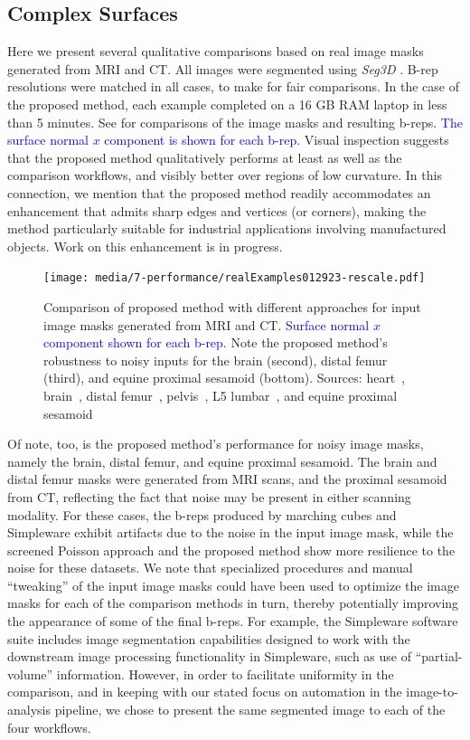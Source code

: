 \subsection{Complex Surfaces}
\label{Complex Surfaces}

Here we present several qualitative comparisons based on real image masks generated from MRI and CT.  All images were segmented using \textit{Seg3D} \cite{Seg3D}.  B-rep resolutions were matched in all cases, to make for fair comparisons.  In the case of the proposed method, each example completed on a 16 GB RAM laptop in less than 5 minutes. See  for comparisons of the image masks and resulting b-reps.  \textcolor{blue}{The surface normal $x$ component is shown for each b-rep.}  Visual inspection suggests that the proposed method qualitatively performs at least as well as the comparison workflows, and visibly better over regions of low curvature.   In this connection, we mention that the proposed method readily accommodates an enhancement that admits sharp edges and vertices (or corners), making the method particularly suitable for industrial applications involving manufactured objects.  Work on this enhancement is in progress.  
\begin{figure}[h!]
	\centering
	 \texttt{[image: media/7-performance/realExamples012923-rescale.pdf]}
	\caption{{Comparison of proposed method with different approaches for input image masks generated from MRI and CT. \textcolor{blue}{Surface normal $x$ component shown for each b-rep.} Note the proposed method's robustness to noisy inputs for the brain (second), distal femur (third), and equine proximal sesamoid (bottom). Sources: heart~\cite{cvgg}, brain~\cite{marcus_2007}, distal femur~\cite{epperson_2013}, pelvis~\cite{clark_2013}, L5 lumbar~\cite{yao_2016}, and equine proximal sesamoid~\cite{shaffer2021}}}
	\label{fig:example-meshes}
\end{figure}
\clearpage
Of note, too, is the proposed method's performance for noisy image masks, namely the brain, distal femur, and equine proximal sesamoid. The brain and distal femur masks were generated from MRI scans, and the proximal sesamoid from CT, reflecting the fact that noise may be present in either scanning modality.  For these cases, the b-reps produced by marching cubes and Simpleware exhibit artifacts due to the noise in the input image mask, while the screened Poisson approach and the proposed method show more resilience to the noise for these datasets.  We note that specialized procedures and manual ``tweaking'' of the input image masks could have been used to optimize the image masks for each of the comparison methods in turn, thereby potentially improving the appearance of some of the final b-reps.  For example, the Simpleware software suite includes image segmentation capabilities designed to work with the downstream image processing functionality in Simpleware, such as use of ``partial-volume'' information.  However, in order to facilitate uniformity in the comparison, and in keeping with our stated focus on automation in the image-to-analysis pipeline, we chose to present the same segmented image to each of the four workflows.
